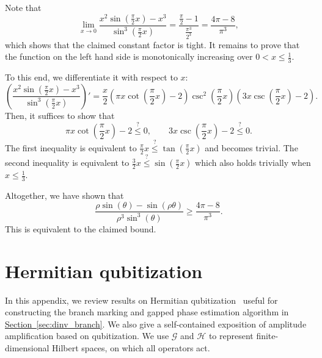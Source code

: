 \documentclass[letterpaper,onecolumn,11pt,accepted=2026-02-14]{quantumarticle}
\theoremstyle{remark}
\theoremstyle{plain}
\renewcommand{\sec}[1]{\hyperref[sec:#1]{Section~\ref*{sec:#1}}}
\begin{document}
Note that 
\begin{equation}
    \lim_{x\rightarrow0}\frac{x^2\sin\left(\frac{\pi}{2}x\right)-x^3}{\sin^3\left(\frac{\pi}{2}x\right)}
    =\frac{\frac{\pi}{2}-1}{\frac{\pi^3}{2^3}}
    =\frac{4\pi-8}{\pi^3},
\end{equation}
which shows that the claimed constant factor is tight. It remains to prove that the function on the left hand side is monotonically increasing over $0<x\leq\frac{1}{3}$.

To this end, we differentiate it with respect to $x$:
\begin{equation}
    \left(\frac{x^2\sin\left(\frac{\pi}{2}x\right)-x^3}{\sin^3\left(\frac{\pi}{2}x\right)}\right)'
    =\frac{x}{2}
    \left(\pi x\cot\left(\frac{\pi}{2}x\right)-2\right)
    \csc^2\left(\frac{\pi}{2}x\right)
    \left(3x\csc\left(\frac{\pi}{2}x\right)-2\right).
\end{equation}
Then, it suffices to show that
\begin{equation}
    \pi x\cot\left(\frac{\pi}{2}x\right)-2\overset{?}{\leq}0,\qquad
    3x\csc\left(\frac{\pi}{2}x\right)-2\overset{?}{\leq}0.
\end{equation}
The first inequality is equivalent to $\frac{\pi}{2}x\overset{?}{\leq}\tan\left(\frac{\pi}{2}x\right)$ and becomes trivial. The second inequality is equivalent to $\frac{3}{2}x\overset{?}{\leq}\sin\left(\frac{\pi}{2}x\right)$ which also holds trivially when $x\leq\frac{1}{3}$.

Altogether, we have shown that
\begin{equation}
    \frac{\rho\sin(\theta)-\sin(\rho\theta)}{\rho^3\sin^3(\theta)}
    \geq\frac{4\pi-8}{\pi^3}.
\end{equation}
This is equivalent to the claimed bound.

\section{Hermitian qubitization}
\label{append:qubitization}

In this appendix, we review results on Hermitian qubitization~\cite{Low2016Qubitization} useful for constructing the branch marking and gapped phase estimation algorithm in \sec{dinv_branch}. We also give a self-contained exposition of amplitude amplification based on qubitization. We use $\mathcal{G}$ and $\mathcal{H}$ to represent finite-dimensional Hilbert spaces, on which all operators act.
\end{document}
